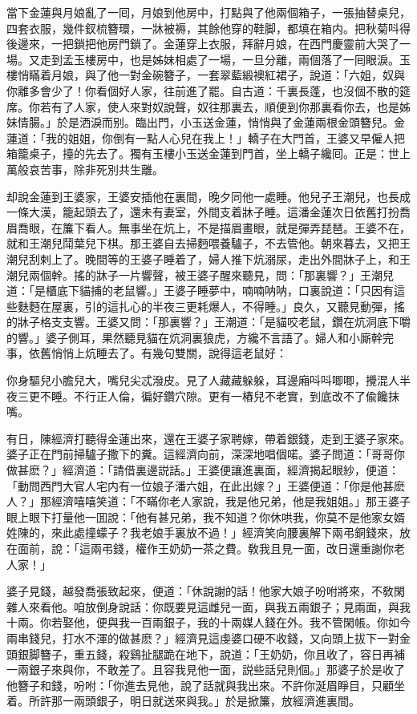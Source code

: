 當下金蓮與月娘亂了一囘，月娘到他房中，打點與了他兩個箱子，一張抽替桌兒，四套衣服，幾件釵梳簪環，一牀被褥，其餘他穿的鞋脚，都填在箱内。把秋菊呌得後邊來，一把鎖把他房門鎖了。金蓮穿上衣服，拜辭月娘，在西門慶靈前大哭了一場。又走到孟玉樓房中，也是姊妹相處了一場，一旦分離，兩個落了一囘眼淚。玉樓悄瞞着月娘，與了他一對金碗簪子，一套翠藍緞襖紅裙子，說道：「六姐，奴與你離多會少了！你看個好人家，往前進了罷。自古道：千裏長蓬，也沒個不散的筵席。你若有了人家，使人來對奴說聲，奴往那裏去，順便到你那裏看你去，也是姊妹情腸。」於是洒淚而别。臨出門，小玉送金蓮，悄悄與了金蓮兩根金頭簪兒。金蓮道：「我的姐姐，你倒有一點人心兒在我上！」轎子在大門首，王婆又早僱人把箱籠桌子，擡的先去了。獨有玉樓小玉送金蓮到門首，坐上轎子纔囘。正是：世上萬般哀苦事，除非死別共生離。

却說金蓮到王婆家，王婆安插他在裏間，晚夕同他一處睡。他兒子王潮兒，也長成一條大漢，籠起頭去了，還未有妻室，外間支着牀子睡。這潘金蓮次日依舊打扮喬眉喬眼，在簾下看人。無事坐在炕上，不是描眉畫眼，就是彈弄琵琶。王婆不在，就和王潮兒鬦葉兒下棋。那王婆自去掃麪喂養驢子，不去管他。朝來暮去，又把王潮兒刮剌上了。晚間等的王婆子睡着了，婦人推下炕溺尿，走出外間牀子上，和王潮兒兩個幹。搖的牀子一片響聲，被王婆子醒來聽見，問：「那裏響？」王潮兒道：「是櫃底下貓捕的老鼠響。」王婆子睡夢中，喃喃呐呐，口裏說道：「只因有這些麩麪在屋裏，引的這扎心的半夜三更耗爆人，不得睡。」良久，又聽見動彈，搖的牀子格支支響。王婆又問：「那裏響？」王潮道：「是貓咬老鼠，鑽在炕洞底下嚼的響。」婆子側耳，果然聽見貓在炕洞裏狼虎，方纔不言語了。婦人和小廝幹完事，依舊悄悄上炕睡去了。有幾句雙關，說得這老鼠好：

\begin{myquote}
你身驅兒小膽兒大，嘴兒尖忒潑皮。見了人藏藏躲躲，耳邊廂呌呌唧唧，攪混人半夜三更不睡。不行正人倫，徧好鑽穴隙。更有一樁兒不老實，到底改不了偸饞抹嘴。
\end{myquote}

有日，陳經濟打聽得金蓮出來，還在王婆子家聘嫁，帶着銀錢，走到王婆子家來。婆子正在門前掃驢子撒下的糞。這經濟向前，深深地唱個喏。婆子問道：「哥哥你做甚麽？」經濟道：「請借裏邊説話。」王婆便讓進裏面，經濟揭起眼紗，便道：「動問西門大官人宅内有一位娘子潘六姐，在此出嫁？」王婆便道：「你是他甚麽人？」那經濟嘻嘻笑道：「不瞞你老人家說，我是他兄弟，他是我姐姐。」那王婆子眼上眼下打量他一囬說：「他有甚兄弟，我不知道？你休哄我，你莫不是他家女婿姓陳的，來此處撞蠓子？我老娘手裏放不過！」經濟笑向腰裏解下兩弔銅錢來，放在面前，說：「這兩弔錢，權作王奶奶一茶之費。敎我且見一面，改日還重謝你老人家！」

婆子見錢，越發喬張致起來，便道：「休說謝的話！他家大娘子吩咐將來，不敎閑雜人來看他。咱放倒身說話：你既要見這雌兒一面，與我五兩銀子；見兩面，與我十兩。你若娶他，便與我一百兩銀子，我的十兩媒人錢在外。我不管閑帳。你如今兩串錢兒，打水不渾的做甚麽？」經濟見這虔婆口硬不收錢，又向頭上拔下一對金頭銀脚簪子，重五錢，殺鷄扯腿跪在地下，說道：「王奶奶，你且收了，容日再補一兩銀子來與你，不敢差了。且容我見他一面，説些話兒則個。」那婆子於是收了他簪子和錢，吩咐：「你進去見他，說了話就與我出來。不許你涎眉睜目，只顧坐着。所許那一兩頭銀子，明日就送來與我。」於是掀簾，放經濟進裏間。

